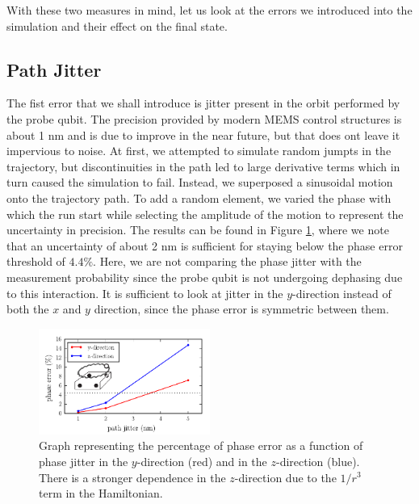 With these two measures in mind, let us look at the errors we introduced into the simulation and their effect on the final state. 




\subsection{Path Jitter}\label{sec:jitter}
The fist error that we shall introduce is jitter present in the orbit performed by the probe qubit. The precision provided by modern MEMS control structures is about 1 nm \cite{MEMS precision} and is due to improve in the near future, but that does ont leave it impervious to noise. At first, we attempted to simulate random jumpts in the trajectory, but discontinuities in the path led to large derivative terms which in turn caused the simulation to fail. Instead, we superposed a sinusoidal motion onto the trajectory path. To add a random element, we varied the phase with which the run start while selecting the amplitude of the motion to represent the uncertainty in precision. The results can be found in Figure \ref{fig:pathjitter}, where we note that an uncertainty of about 2 nm is sufficient for staying below the phase error threshold of $4.4 \%$. Here, we are not comparing the phase jitter with the measurement probability since the probe qubit is not undergoing dephasing due to this interaction. It is sufficient to look at jitter in the $y$-direction instead of both the $x$ and $y$ direction, since the phase error is symmetric between them. 



\begin{figure}[h]
  \centering
    \includegraphics[width=0.5\textwidth]{../Figures/path_jit.pdf}
      \caption{Graph representing the percentage of phase error as a function of phase jitter in the $y$-direction (red) and in the $z$-direction (blue). There is a stronger dependence in the $z$-direction due to the $1/r^3$ term in the Hamiltonian.}
      \label{fig:pathjitter}
\end{figure}


